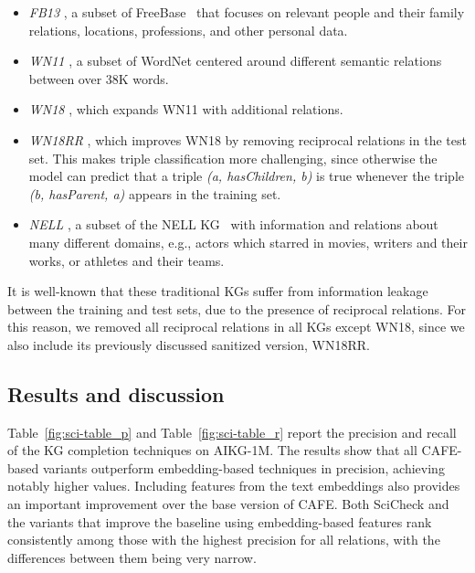 \begin{itemize}
    \item \textit{FB13} \cite{socher2013}, a subset of FreeBase~\cite{bollacker2008} that focuses on relevant people and their family relations, locations, professions, and other personal data.\\
        
    \item \textit{WN11} \cite{bordes2013}, a subset of WordNet centered around different semantic relations between over 38K words.\\
        
    \item \textit{WN18} \cite{bordes2014}, which expands WN11 with additional relations.\\
    
    \item \textit{WN18RR} \cite{dettmers2018}, which improves WN18 by removing reciprocal relations in the test set. This makes triple classification more challenging, since otherwise the model can predict that a triple \textit{(a, hasChildren, b)} is true whenever the triple \textit{(b, hasParent, a)} appears in the training set.\\
        
    \item \textit{NELL} \cite{gardner2015}, a subset of the NELL KG~\cite{mitchell2018} with information and relations about many different domains, e.g., actors which starred in movies, writers and their works, or athletes and their teams.\\
\end{itemize}

It is well-known \cite{dettmers2018} that these traditional KGs suffer from information leakage between the training and test sets, due to the presence of reciprocal relations. For this reason, we removed all reciprocal relations in all KGs except WN18, since we also include its previously discussed sanitized version, WN18RR.

\subsection{Results and discussion}\label{sec:sci-results}
Table~\ref{fig:sci-table_p} and Table~\ref{fig:sci-table_r} report the precision and recall of the KG completion techniques on AIKG-1M. The results show that all CAFE-based variants outperform embedding-based techniques in precision, achieving notably higher values. Including features from the text embeddings also provides an important improvement over the base version of CAFE. Both SciCheck and the variants that improve the baseline using embedding-based features rank consistently among those with the highest precision for all relations, with the differences between them being very narrow.


